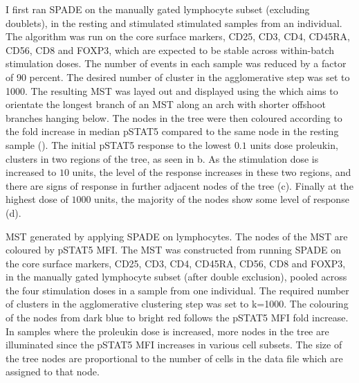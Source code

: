 I first ran \gls{SPADE} on the manually gated lymphocyte subset (excluding doublets),
in the resting and stimulated stimulated samples from an individual.
The algorithm was run on the core surface markers, CD25, CD3, CD4, CD45RA, CD56, CD8 and FOXP3,
which are expected to be stable across within-batch stimulation doses.
The number of events in each sample was reduced by a factor of 90 percent.
The desired number of cluster in the agglomerative step was set to 1000.
The resulting \gls{MST} was layed out and displayed using the 
which aims to orientate the longest branch of an \gls{MST} along an arch with shorter offshoot branches hanging below.
The nodes in the tree were then coloured according to the fold increase in median pSTAT5 compared to the same node
in the resting sample ().
The initial pSTAT5 response to the lowest $0.1$ units dose proleukin, clusters in two regions of the tree,
as seen in b.
As the stimulation dose is increased to $10$ units, the level of the response increases in these two regions,
and there are signs of response in further adjacent nodes of the tree (c).
Finally at the highest dose of $1000$ units, the majority of the nodes show some level of response (d).

{\gls{MST} generated by applying \gls{SPADE} on lymphocytes. The nodes of the \gls{MST} are coloured by pSTAT5 \gls{MFI}.}
{
  The \gls{MST} was constructed from running \gls{SPADE} on the core surface markers,
  CD25, CD3, CD4, CD45RA, CD56, CD8 and FOXP3, in the manually gated lymphocyte subset (after double exclusion),
  pooled across the four stimulation doses in a sample from one individual.
  The required number of clusters in the agglomerative clustering step was set to k=1000.
  The colouring of the nodes from dark blue to bright red follows the pSTAT5 MFI fold increase.
  In samples where the proleukin dose is increased, more nodes in the tree are illuminated since the pSTAT5 MFI increases in various cell subsets.
  The size of the tree nodes are proportional to the number of cells in the data file which are assigned to that node.
}

